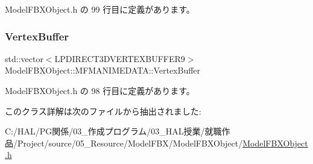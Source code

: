  Model\+F\+B\+X\+Object.\+h の 99 行目に定義があります。

\mbox{\label{class_model_f_b_x_object_1_1_m_f_m_a_n_i_m_e_d_a_t_a_a175ab6151344cd3e7c60dbfbe07bfe6a}} 
\subsubsection{\texorpdfstring{Vertex\+Buffer}{VertexBuffer}}
{\footnotesize\ttfamily std\+::vector$<$L\+P\+D\+I\+R\+E\+C\+T3\+D\+V\+E\+R\+T\+E\+X\+B\+U\+F\+F\+E\+R9$>$ Model\+F\+B\+X\+Object\+::\+M\+F\+M\+A\+N\+I\+M\+E\+D\+A\+T\+A\+::\+Vertex\+Buffer}



 Model\+F\+B\+X\+Object.\+h の 98 行目に定義があります。



このクラス詳解は次のファイルから抽出されました\+:\begin{DoxyCompactItemize}
\item 
C\+:/\+H\+A\+L/\+P\+G関係/03\+\_\+作成プログラム/03\+\_\+\+H\+A\+L授業/就職作品/\+Project/source/05\+\_\+\+Resource/\+Model\+F\+B\+X/\+Model\+F\+B\+X\+Object/\mbox{\hyperlink{_model_f_b_x_object_8h}{Model\+F\+B\+X\+Object.\+h}}\end{DoxyCompactItemize}
